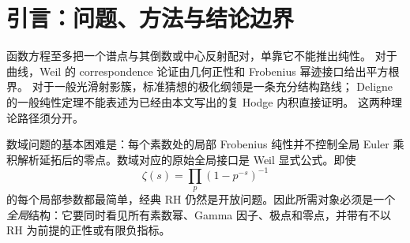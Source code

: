 \documentclass[UTF8,11pt,a4paper]{ctexart}
\theoremstyle{definition}
\theoremstyle{remark}
\newcommand{\1}{\mathbf 1}
\begin{document}
\tableofcontents

\section{引言：问题、方法与结论边界}

函数方程至多把一个谱点与其倒数或中心反射配对，单靠它不能推出纯性。
对于曲线，Weil 的 correspondence 论证由几何正性和 Frobenius 幂迹接口给出平方根界。
对于一般光滑射影簇，标准猜想的极化纲领是一条充分结构路线；
Deligne 的一般纯性定理不能表述为已经由本文写出的复 Hodge 内积直接证明。
这两种理论路径须分开\cite{Deligne1974,GrothendieckStandard,KleimanWeil}。

数域问题的基本困难是：每个素数处的局部 Frobenius 纯性并不控制全局 Euler 乘积解析延拓后的零点。数域对应的原始全局接口是 Weil 显式公式\cite{WeilExplicit}。即使
\[
  \zeta(s)=\prod_p(1-p^{-s})^{-1}
\]
的每个局部参数都最简单，经典 RH 仍然是开放问题。因此所需对象必须是一个\emph{全局}结构：它要同时看见所有素数幂、Gamma 因子、极点和零点，并带有不以 RH 为前提的正性或有限负指标。
\end{document}
